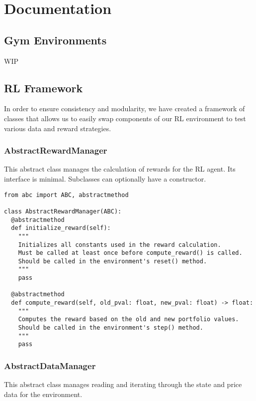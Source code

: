 \chapter{Documentation}

\section{Gym Environments}

WIP

\section{RL Framework}

In order to ensure consistency and modularity, we have created a framework of classes
that allows us to easily swap components of our RL environment to test various data
and reward strategies.

\subsection{AbstractRewardManager}

This abstract class manages the calculation of rewards for the RL agent.
Its interface is minimal. Subclasses can optionally have a constructor.

\begin{verbatim}
from abc import ABC, abstractmethod

class AbstractRewardManager(ABC):
  @abstractmethod
  def initialize_reward(self):
    """
    Initializes all constants used in the reward calculation.
    Must be called at least once before compute_reward() is called.
    Should be called in the environment's reset() method.
    """
    pass

  @abstractmethod
  def compute_reward(self, old_pval: float, new_pval: float) -> float:
    """
    Computes the reward based on the old and new portfolio values.
    Should be called in the environment's step() method.
    """
    pass
\end{verbatim}


\subsection{AbstractDataManager}

This abstract class manages reading and iterating through the state and price data for the environment.

